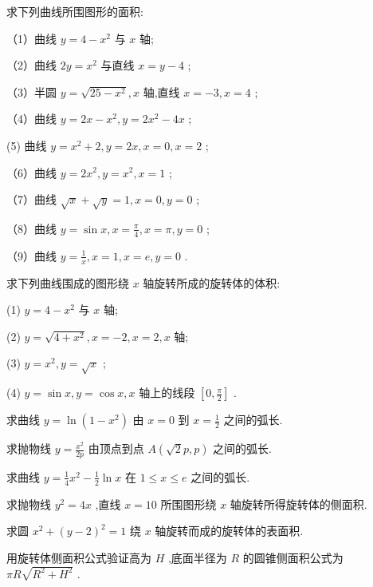 \documentclass[lang=cn,newtx,10pt,scheme=chinese]{elegantbook}
\begin{document}
\begin{problemset}[习题十六]

\item 求下列曲线所围图形的面积:

（1）曲线 \(y = 4 - {x}^{2}\) 与 \(x\) 轴;

（2）曲线 \({2y} = {x}^{2}\) 与直线 \(x = y - 4\) ;

（3）半圆 \(y = \sqrt{{25} - {x}^{2}},x\) 轴,直线 \(x = - 3,x = 4\) ;

（4）曲线 \(y = {2x} - {x}^{2},y = 2{x}^{2} - {4x}\) ;

(5) 曲线 \(y = {x}^{2} + 2,y = {2x},x = 0,x = 2\) ;

（6）曲线 \(y = 2{x}^{2},y = {x}^{2},x = 1\) ;

（7）曲线 \(\sqrt{x} + \sqrt{y} = 1,x = 0,y = 0\) ;

（8）曲线 \(y = \sin x,x = \frac{\pi }{4},x = \pi ,y = 0\) ;

（9）曲线 \(y = \frac{1}{x},x = 1,x = e,y = 0\) .

\item 求下列曲线围成的图形绕 \(x\) 轴旋转所成的旋转体的体积:

(1) \(y = 4 - {x}^{2}\) 与 \(x\) 轴;

(2) \(y = \sqrt{4 + {x}^{2}},x = - 2,x = 2,x\) 轴;

(3) \(y = {x}^{2},y = \sqrt{x}\) ;

(4) \(y = \sin x,y = \cos x,x\) 轴上的线段 \(\left\lbrack {0,\frac{\pi }{2}}\right\rbrack\) .

\item * 求曲线 \(y = \ln \left( {1 - {x}^{2}}\right)\) 由 \(x = 0\) 到 \(x = \frac{1}{2}\) 之间的弧长.

\item * 求抛物线 \(y = \frac{{x}^{2}}{2p}\) 由顶点到点 \(A\left( {\sqrt{2}p,p}\right)\) 之间的弧长.

\item * 求曲线 \(y = \frac{1}{4}{x}^{2} - \frac{1}{2}\ln x\) 在 \(1 \leq x \leq e\) 之间的弧长.

\item * 求抛物线 \({y}^{2} = {4x}\) ,直线 \(x = {10}\) 所围图形绕 \(x\) 轴旋转所得旋转体的侧面积.

\item * 求圆 \({x}^{2} + {\left( y - 2\right) }^{2} = 1\) 绕 \(x\) 轴旋转而成的旋转体的表面积.

\item * 用旋转体侧面积公式验证高为 \(H\) ,底面半径为 \(R\) 的圆锥侧面积公式为 \({\pi R}\sqrt{{R}^{2} + {H}^{2}}\) .

\end{problemset}
\end{document}
